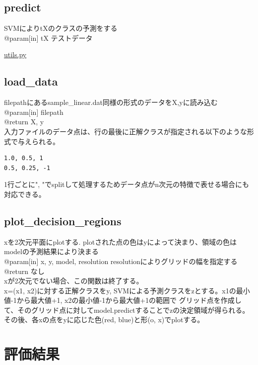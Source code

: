 \documentclass{jsarticle}
\begin{document}
\subsection*{predict}
SVMによりtXのクラスの予測をする \\
@param[in] tX テストデータ


\underline{utils.py}
\subsection*{load\_data}
filepathにあるsample\_linear.dat同様の形式のデータをX,yに読み込む \\
@param[in] filepath \\
@return X, y \\
入力ファイルのデータ点は、行の最後に正解クラスが指定される以下のような形式で与えられる。
\begin{lstlisting}
1.0, 0.5, 1
0.5, 0.25, -1
\end{lstlisting}
1行ごとに", "でsplitして処理するためデータ点がn次元の特徴で表せる場合にも対応できる。

\subsection*{plot\_decision\_regions}
xを2次元平面にplotする.
plotされた点の色はyによって決まり、領域の色はmodelの予測結果により決まる \\
@param[in] x, y, model, resolution resolutionによりグリッドの幅を指定する \\
@return なし \\
xが2次元でない場合、この関数は終了する。\\
x=(x1, x2)に対する正解クラスをy, SVMによる予測クラスをzとする。x1の最小値-1から最大値+1, x2の最小値-1から最大値+1の範囲で
グリッド点を作成して、そのグリッド点に対してmodel.predictすることでzの決定領域が得られる。\\
その後、各xの点をyに応じた色(red, blue)と形(o, x)でplotする。

\section{評価結果}
\end{document}
